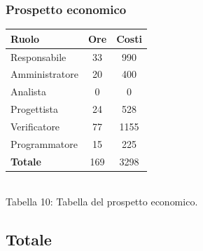 \subsubsection{Prospetto economico}
\begin{center}
\begin{tabular}{| l | c | c |}
\hline
Ruolo & Ore & Costi \\
\hline
Responsabile & 33 & 990 \\
Amministratore & 20 & 400 \\
Analista & 0 & 0\\
Progettista & 24 & 528 \\
Verificatore & 77 & 1155 \\
Programmatore & 15 & 225 \\
\hline
\textbf{Totale} & 169 & 3298 \\
\hline
\end{tabular}
\\
Tabella 10: Tabella del prospetto economico.
\end{center}
\subsection{Totale}
